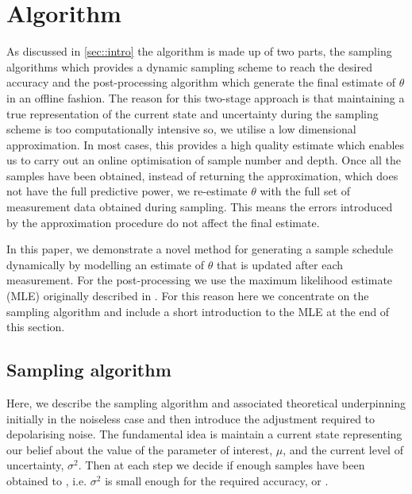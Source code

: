 
\section{Algorithm}
As discussed in \ref{sec::intro} the algorithm is made up of two parts, the sampling algorithms which provides a dynamic sampling scheme to reach the desired accuracy and the post-processing algorithm which generate the final estimate of $\theta$ in an offline fashion. The reason for this two-stage approach is that maintaining a true representation of the current state and uncertainty during the sampling scheme is too computationally intensive so, we utilise a low dimensional approximation. In most cases, this provides a high quality estimate which enables us to carry out an online optimisation of sample number and depth. Once all the samples have been obtained, instead of returning the approximation, which does not have the full predictive power, we re-estimate $\theta$ with the full set of measurement data obtained during sampling. This means the errors introduced by the approximation procedure do not affect the final estimate.

In this paper, we demonstrate a novel method for generating a sample schedule dynamically by modelling an estimate of $\theta$ that is updated after each measurement. For the post-processing we use the maximum likelihood estimate (MLE) originally described in \cite{MLE}. For this reason here we concentrate on the sampling algorithm and include a short introduction to the MLE at the end of this section.
\subsection{Sampling algorithm}
Here, we describe the sampling algorithm and associated theoretical underpinning initially in the noiseless case and then introduce the adjustment required to  depolarising noise. The fundamental idea is  maintain a current state representing our belief about the value of the parameter of interest, $\mu$, and the current level of uncertainty, $\sigma^2$. Then at each step we decide if enough samples have been obtained to , i.e. $\sigma^2$ is small enough for the required accuracy, or .

